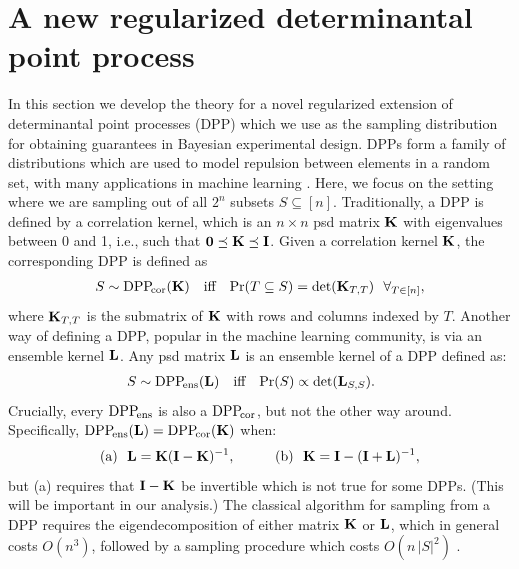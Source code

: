 \documentclass[11pt]{article}
\begin{document}
\section{A new regularized determinantal point process}
\label{s:r-dpp}
  In this section we develop the theory for a novel regularized extension of
  determinantal point processes (DPP) which we use as the sampling distribution
  for obtaining guarantees in Bayesian experimental design.
  DPPs form a family of distributions which are used to model repulsion between
  elements in a random set, with many applications in machine learning
  \citep{dpp-ml}. Here, we focus on the setting where we are sampling out of all
  $2^n$ subsets $S\subseteq[n]$. Traditionally, a DPP is defined by a
  correlation kernel, which is an $n\times n$ psd matrix $\mathbf K$ with eigenvalues
  between 0 and 1, i.e., such that $\mathbf 0\preceq\mathbf K\preceq \mathbf I$. Given a
  correlation kernel $\mathbf K$, the corresponding DPP is
  defined as
  \begin{align*}
    S\sim{{\mathrm{DPP}}_{\!\mathrm{cor}}}(\mathbf K)\quad\text{iff}\quad
    \mathrm{Pr}(T\subseteq S) = \det(\mathbf K_{T,T})\ \  \forall_{T\in[n]},
  \end{align*}
where $\mathbf K_{T,T}$ is the submatrix of $\mathbf K$ with rows and columns
indexed by $T$. Another way of defining a DPP, popular in the machine
learning community, is via an ensemble kernel $\mathbf{L}$. Any psd matrix
$\mathbf{L}$ is an ensemble kernel of a DPP defined as:
  \begin{align*}
    S\sim{{\mathrm{DPP}}_{\!\mathrm{ens}}}(\mathbf{L})\quad\text{iff}\quad \mathrm{Pr}(S) \propto \det(\mathbf{L}_{S,S}).\quad~
  \end{align*}
Crucially, every ${{\mathrm{DPP}}_{\!\mathrm{ens}}}$ is also a ${{\mathrm{DPP}}_{\!\mathrm{cor}}}$, but not the other way
around. Specifically, ${{\mathrm{DPP}}_{\!\mathrm{ens}}}(\mathbf{L})={{\mathrm{DPP}}_{\!\mathrm{cor}}}(\mathbf K)$ when:
\begin{align*}
  &\text{(a)}\ \  \mathbf{L}=\mathbf K(\mathbf I-\mathbf K)^{-1},\qquad
  &\text{(b)}\ \  \mathbf K = \mathbf I -  (\mathbf I+\mathbf{L})^{-1},
\end{align*}
but (a) requires that $\mathbf I-\mathbf K$ be invertible which is not true
for some DPPs.
(This will be important in our analysis.)
The classical algorithm for sampling from a DPP requires the
eigendecomposition of either matrix $\mathbf K$ or $\mathbf{L}$, which in general
costs $O(n^3)$, followed by a sampling procedure which costs
$O(n\,|S|^2)$ \cite{dpp-independence,dpp-ml}.
\end{document}
